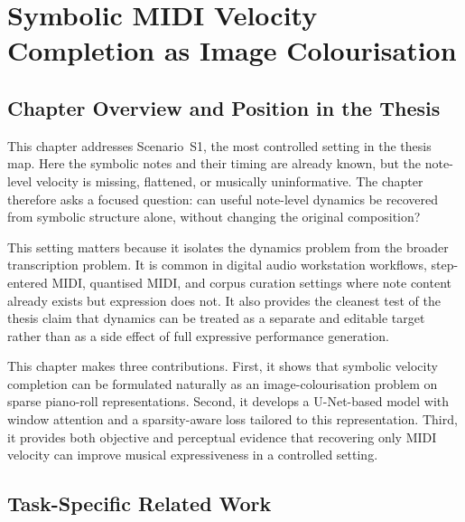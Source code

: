 \newcommand{\eqshift}{\qquad\qquad\qquad\qquad}

\chapter{Symbolic MIDI Velocity Completion as Image Colourisation}
\label{ch:velcomp}


\section{Chapter Overview and Position in the Thesis}
\label{sec:velcomp:overview}

This chapter addresses Scenario~S1, the most controlled setting in the thesis map. Here the symbolic notes and their timing are already known, but the note-level velocity is missing, flattened, or musically uninformative. The chapter therefore asks a focused question: can useful note-level dynamics be recovered from symbolic structure alone, without changing the original composition?

This setting matters because it isolates the dynamics problem from the broader transcription problem. It is common in digital audio workstation workflows, step-entered MIDI, quantised MIDI, and corpus curation settings where note content already exists but expression does not. It also provides the cleanest test of the thesis claim that dynamics can be treated as a separate and editable target rather than as a side effect of full expressive performance generation.

This chapter makes three contributions. First, it shows that symbolic velocity completion can be formulated naturally as an image-colourisation problem on sparse piano-roll representations. Second, it develops a U-Net-based model with window attention and a sparsity-aware loss tailored to this representation. Third, it provides both objective and perceptual evidence that recovering only MIDI velocity can improve musical expressiveness in a controlled setting.

\section{Task-Specific Related Work}
\label{sec:velcomp:related}

